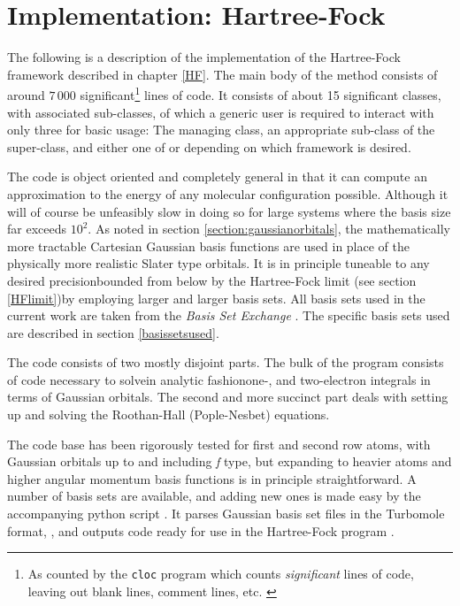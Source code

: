 \documentclass[../../master.tex]{subfiles}
\begin{document}
\chapter{Implementation: Hartree-Fock\label{HFI}}
The following is a description of the implementation of the Hartree-Fock framework described in chapter \ref{HF}. The main body of the method consists of around $7\,000$ significant\footnote{As counted by the \lstinline{cloc} program which counts \emph{significant} lines of code, leaving out blank lines, comment lines, etc. \cite{cloc}} lines of \CC{}  code. It consists of about 15 significant classes, with associated sub-classes, of which a generic user is required to interact with only three for basic usage: The managing  class, an appropriate sub-class of the  super-class, and either one of  or  depending on which framework is desired.

The code is object oriented and completely general in that it can compute an approximation to the energy of any molecular configuration possible. Although it will of course be unfeasibly slow in doing so for large systems where the basis size far exceeds $10^2$. As noted in section \ref{section:gaussianorbitals}, the mathematically more tractable Cartesian Gaussian basis functions are used in place of the physically more realistic Slater type orbitals. It is in principle tuneable to any desired precision\textemdash bounded from below by the Hartree-Fock limit (see section \ref{HFlimit})\textemdash by employing larger and larger basis sets. All basis sets used in the current work are taken from the \emph{Basis Set Exchange} \cite{basissetexchange}. The specific basis sets used are described in section \ref{basissetsused}.

The code consists of two mostly disjoint parts. The bulk of the program consists of code necessary to solve\textemdash in analytic fashion\textemdash one-, and two-electron integrals in terms of Gaussian orbitals. The second and more succinct part deals with setting up and solving the Roothan-Hall (Pople-Nesbet) equations. 


The code base has been rigorously tested for first and second row atoms, with Gaussian orbitals up to and including \emph{f} type, but expanding to heavier atoms and higher angular momentum basis functions is in principle straightforward. A number of basis sets are available, and adding new ones is made easy by the accompanying python script . It parses Gaussian basis set files in the Turbomole format, , and outputs \CC{}  code ready for use in the Hartree-Fock program \cite{TURBOMOLE}. 
\end{document}
